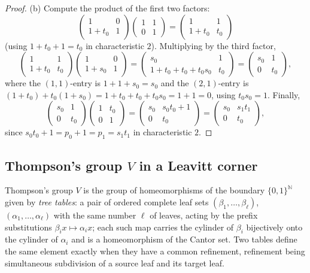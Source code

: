 \documentclass[11pt]{amsart}
\theoremstyle{definition}
\theoremstyle{plain}
\newcommand{\N}{\mathbb N}
\begin{document}
\begin{proof}
(b) Compute the product of the first two factors:
\[
 \begin{pmatrix}1&0\\1+t_0&1\end{pmatrix}
 \begin{pmatrix}1&1\\0&1\end{pmatrix}
 =\begin{pmatrix}1&1\\1+t_0&t_0\end{pmatrix}
\]
(using \(1+t_0+1=t_0\) in characteristic \(2\)).  Multiplying by the third factor,
\[
 \begin{pmatrix}1&1\\1+t_0&t_0\end{pmatrix}
 \begin{pmatrix}1&0\\1+s_0&1\end{pmatrix}
 =\begin{pmatrix}s_0&1\\ 1+t_0+t_0+t_0s_0&t_0\end{pmatrix}
 =\begin{pmatrix}s_0&1\\ 0&t_0\end{pmatrix},
\]
where the \((1,1)\)-entry is \(1+1+s_0=s_0\) and the \((2,1)\)-entry is \((1+t_0)+t_0(1+s_0)=1+t_0+t_0+t_0s_0=1+1=0\), using \(t_0s_0=1\).  Finally,
\[
 \begin{pmatrix}s_0&1\\ 0&t_0\end{pmatrix}
 \begin{pmatrix}1&t_0\\0&1\end{pmatrix}
 =\begin{pmatrix}s_0&s_0t_0+1\\ 0&t_0\end{pmatrix}
 =\begin{pmatrix}s_0&s_1t_1\\ 0&t_0\end{pmatrix},
\]
since \(s_0t_0+1=p_0+1=p_1=s_1t_1\) in characteristic \(2\).
\end{proof}

\subsection{Thompson's group \texorpdfstring{$V$}{V} in a Leavitt corner}\label{subsec:thompson}

Thompson's group \(V\) is the group of homeomorphisms of the boundary \(\{0,1\}^{\N}\) given by \emph{tree tables}: a pair of ordered complete leaf sets \((\beta_1,\dots,\beta_\ell)\), \((\alpha_1,\dots,\alpha_\ell)\) with the same number \(\ell\) of leaves, acting by the prefix substitutions \(\beta_i x\mapsto\alpha_i x\); each such map carries the cylinder of \(\beta_i\) bijectively onto the cylinder of \(\alpha_i\) and is a homeomorphism of the Cantor set.  Two tables define the same element exactly when they have a common refinement, refinement being simultaneous subdivision of a source leaf and its target leaf.
\end{document}
